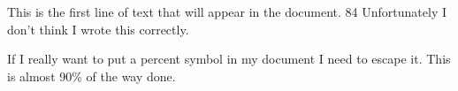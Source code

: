\documentclass{article}
\begin{document}
This is the first line of text that will appear in the document.
84%
Unfortunately I don't think I wrote this correctly.

If I really want to put a percent symbol in my document I need to
escape it. This is almost 90\% of the way done.
\end{document}
